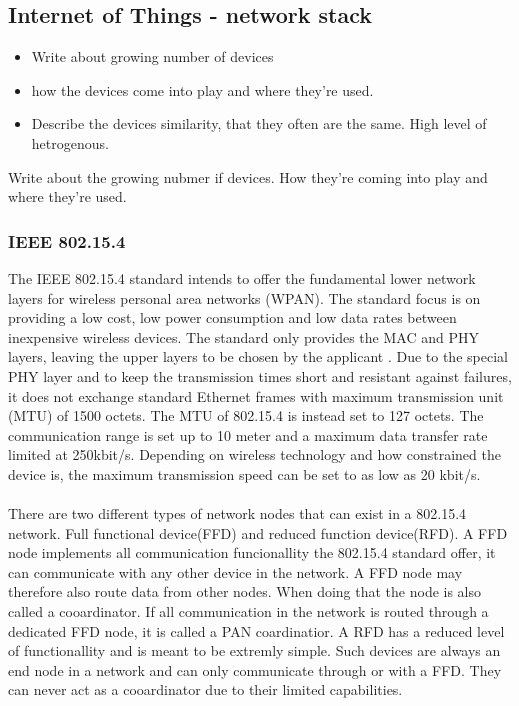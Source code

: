 \subsection{Internet of Things - network stack}

\begin{itemize}
	\item Write about growing number of devices
	\item how the devices come into play and where they're used.
	\item Describe the devices similarity, that they often are the same. High level of hetrogenous.
\end{itemize}


Write about the growing nubmer if devices. How they're coming into play and where they're used.

\subsubsection{IEEE 802.15.4}
The IEEE 802.15.4 standard intends to offer the fundamental lower network layers for wireless personal area networks (WPAN).  The standard focus is on providing a low cost, low power consumption and low data rates between inexpensive wireless devices. 
The standard only provides the MAC and PHY layers, leaving the upper layers to be chosen by the applicant\cite{6185525} \cite{radio-electronic-802-15-4}. Due to the special PHY layer and to keep the transmission times short and resistant against failures, it does not exchange standard Ethernet frames with maximum transmission unit (MTU) of 1500 octets. The MTU of 802.15.4 is instead set to 127 octets. The communication range is set up to 10 meter and a maximum data transfer rate limited at 250kbit/s. Depending on wireless technology and how constrained the device is, the maximum transmission speed can be set to as low as 20 kbit/s.
\\\\
There are two different types of network nodes that can exist in a 802.15.4 network\cite{radio-electronic-802-15-4}. Full functional device(FFD) and reduced function device(RFD). A FFD node implements all communication funcionallity the 802.15.4 standard offer, it can communicate with any other device in the network. A FFD node may therefore also route data from other nodes. When doing that the node is also called a cooardinator. If all communication in the network is routed through a dedicated FFD node, it is called a PAN coardinatior. A RFD has a reduced level of functionallity and is meant to be extremly simple. Such devices are always an end node in a network and can only communicate through or with a FFD. They can never act as a cooardinator due to their limited capabilities.
